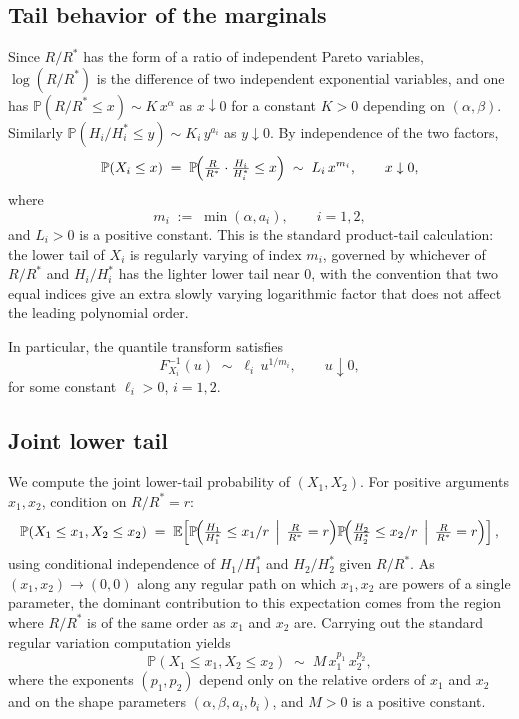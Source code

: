 \documentclass[11pt]{article}
\theoremstyle{definition}
\newcommand{\E}{\mathbb{E}}
\newcommand{\Prob}{\mathbb{P}}
\begin{document}
\subsection{Tail behavior of the marginals}

Since $R/R^*$ has the form of a ratio of independent Pareto variables,
$\log(R/R^*)$ is the difference of two independent exponential
variables, and one has $\Prob(R/R^*\le x)\sim K\, x^{\alpha}$ as
$x\downarrow 0$ for a constant $K>0$ depending on $(\alpha,\beta)$.
Similarly $\Prob(H_i/H_i^*\le y)\sim K_i\, y^{a_i}$ as $y\downarrow 0$.
By independence of the two factors,
\[
\Prob(X_i\le x) \;=\; \Prob\!\Bigl(\tfrac{R}{R^*}\cdot\tfrac{H_i}{H_i^*}\le x\Bigr)
\;\sim\; L_i\, x^{m_i}, \qquad x\downarrow 0,
\]
where
\begin{equation}\label{eq:mi}
m_i \;:=\; \min(\alpha,a_i), \qquad i=1,2,
\end{equation}
and $L_i>0$ is a positive constant. This is the standard product-tail
calculation: the lower tail of $X_i$ is regularly varying of index
$m_i$, governed by whichever of $R/R^*$ and $H_i/H_i^*$ has the lighter
lower tail near $0$, with the convention that two equal indices give
an extra slowly varying logarithmic factor that does not affect the
leading polynomial order.

In particular, the quantile transform satisfies
\begin{equation}\label{eq:quantile-asymp}
F_{X_i}^{-1}(u) \;\sim\; \ell_i\, u^{1/m_i}, \qquad u\downarrow 0,
\end{equation}
for some constant $\ell_i>0$, $i=1,2$.

\subsection{Joint lower tail}

We compute the joint lower-tail probability of $(X_1,X_2)$. For
positive arguments $x_1,x_2$, condition on $R/R^*=r$:
\[
\Prob(X_1\le x_1,X_2\le x_2)
\;=\;
\E\!\left[\Prob\!\Bigl(\tfrac{H_1}{H_1^*}\le x_1/r\,\Bigm|\,\tfrac{R}{R^*}=r\Bigr)
\Prob\!\Bigl(\tfrac{H_2}{H_2^*}\le x_2/r\,\Bigm|\,\tfrac{R}{R^*}=r\Bigr)\right],
\]
using conditional independence of $H_1/H_1^*$ and $H_2/H_2^*$ given
$R/R^*$. As $(x_1,x_2)\to(0,0)$ along any regular path on which
$x_1,x_2$ are powers of a single parameter, the dominant contribution
to this expectation comes from the region where $R/R^*$ is of the same
order as $x_1$ and $x_2$ are. Carrying out the standard regular
variation computation yields
\begin{equation}\label{eq:joint-asymp}
\Prob(X_1\le x_1,X_2\le x_2)
\;\sim\;
M\, x_1^{p_1}\, x_2^{p_2},
\end{equation}
where the exponents $(p_1,p_2)$ depend only on the relative orders of
$x_1$ and $x_2$ and on the shape parameters $(\alpha,\beta,a_i,b_i)$,
and $M>0$ is a positive constant.
\end{document}
